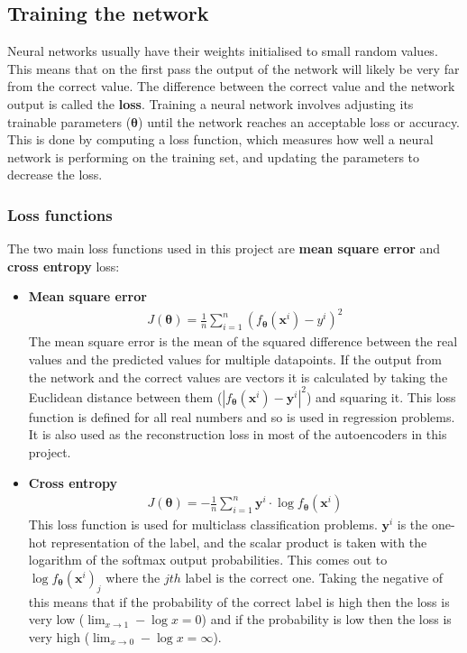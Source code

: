 \documentclass[12pt,a4paper,twoside,openright]{report}
\renewcommand{\vec}[1]{\bm{#1}}
\begin{document}
\subsection{Training the network}

Neural networks usually have their weights initialised to small random values. This means that on the first pass
the output of the network will likely be very far from the correct value. The difference between the correct
value and the network output is called the \textbf{loss}. Training a neural network involves adjusting its
trainable parameters ($\vec{\theta}$) until the network reaches an acceptable loss or accuracy. This is done by computing
a loss function, which measures how well a neural network is performing on the training set, and updating the parameters to decrease the loss.

\subsubsection{Loss functions}

The two main loss functions used in this project are \textbf{mean square error} and \textbf{cross entropy} loss:
\begin{itemize}
  \item \textbf{Mean square error}
        \begin{align}
          J(\vec{\theta}) = \frac{1}{n}\sum_{i=1}^{n} (f_{\vec{\theta}}(\vec{x}^i) - y^i)^2 \label{eq:mse}
        \end{align}
        The mean square error is the mean of the squared difference between the real values and the 
        predicted values for multiple datapoints. If the output from the network and the correct values are 
        vectors it is calculated by taking the Euclidean distance between them ($|f_{\vec{\theta}}(\vec{x}^i) - \vec{y}^i|^{2}$) 
        and squaring it. This loss function is defined for all real numbers and so is used in regression problems. 
        It is also used as the reconstruction loss in most of the autoencoders in this project.
  \item \textbf{Cross entropy}
        \begin{align}
          J(\vec{\theta}) = - \frac{1}{n}\sum_{i=1}^{n} \vec{y}^i \cdot \log{f_{\vec{\theta}}(\vec{x}^i)} \label{eq:ce}
        \end{align}
        This loss function is used for multiclass classification problems. $\vec{y}^i$ is the one-hot 
        representation of the label, and the scalar product is taken with the logarithm of the softmax output 
        probabilities. This comes out to $\log{f_{\vec{\theta}}(\vec{x}^i)_j}$ where the $jth$ label is the correct one.
        Taking the negative of this means that if the probability of the correct label is high then the loss is 
        very low ($\lim_{x \to 1} -\log{x} = 0$) and if the probability is low then the loss is very high 
        ($\lim_{x \to 0} -\log{x} = \infty$).
\end{itemize}
\end{document}

